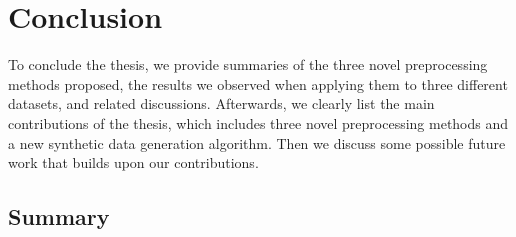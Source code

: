 \documentclass{statsmsc}
\begin{document}
{%

\chapter{Conclusion} %
\label{ch:Conclusion}

To conclude the thesis, we provide summaries of the three novel preprocessing methods proposed,
the results we observed when applying them to three different datasets, and related
discussions. Afterwards, we clearly list the main contributions of the thesis, which includes
three novel preprocessing methods and a new synthetic data generation algorithm. Then we
discuss some possible future work that builds upon our contributions.

\vspace*{-10pt} %

\section{Summary}%
\label{sec:Summary}

}
\end{document}
